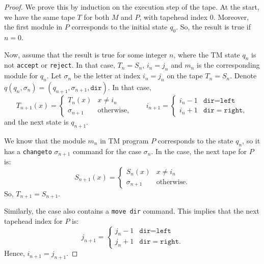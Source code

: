 \documentclass{article}
\theoremstyle{definition}
\theoremstyle{plain}
\begin{document}
\begin{proof}
    We prove this by induction on the execution step of the tape. At the start, we have the same tape $T$ for both $M$ and $P$, with tapehead index $0$. Moreover, the first module in $P$ corresponds to the initial state $q_0$. So, the result is true if $n = 0$.
    
    Now, assume that the result is true for some integer $n$, where the TM state $q_n$ is not \texttt{accept} or \texttt{reject}. In that case, $T_n = S_n$, $i_n = j_n$ and $m_n$ is the corresponding module for $q_n$. Let $\sigma_n$ be the letter at index $i_n = j_n$ on the tape $T_n = S_n$. Denote $q(q_n, \sigma_n) = (q_{n+1}, \sigma_{n+1}, \texttt{dir})$. In that case,
    \[T_{n+1}(x) = \begin{cases}
        T_n(x) & x \neq i_n \\
        \sigma_{n+1} & \text{otherwise},
    \end{cases} \qquad i_{n+1} = \begin{cases}
        i_n - 1 & \texttt{dir} = \texttt{left} \\
        i_n + 1 & \texttt{dir} = \texttt{right},
    \end{cases}\]
    and the next state is $q_{n+1}$. 
    
    We know that the module $m_n$ in TM program $P$ corresponds to the state $q_n$, so it has a \texttt{changeto} $\sigma_{n+1}$ command for the case $\sigma_n$. In the case, the next tape for $P$ is:
    \[S_{n+1}(x) = \begin{cases}
        S_n(x) & x \neq i_n \\
        \sigma_{n+1} & \text{otherwise}.
    \end{cases}\]
    So, $T_{n+1} = S_{n+1}$. 
    
    Similarly, the case also contains a \texttt{move dir} command. This implies that the next tapehead index for $P$ is:
    \[j_{n+1} = \begin{cases}
        j_n - 1 & \texttt{dir} = \texttt{left} \\
        j_n + 1 & \texttt{dir} = \texttt{right}.
    \end{cases}\]
    Hence, $i_{n+1} = j_{n+1}$. 


\end{proof}
\end{document}

